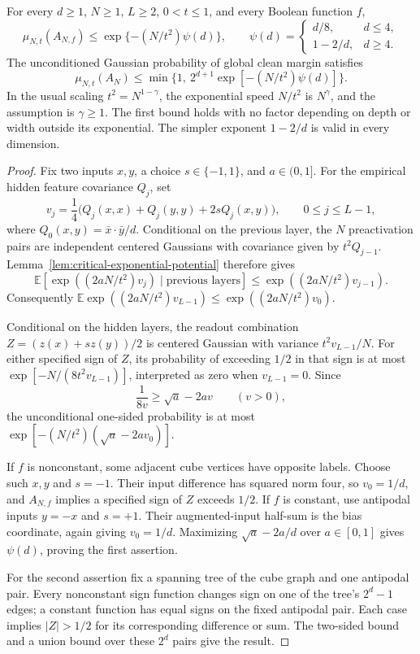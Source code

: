 \begin{theorem}
\label{thm:critical-clean-upper}
For every $d\ge1$, $N\ge1$, $L\ge2$, $0<t\le1$, and every Boolean function $f$,
\[
 \mu_{N,t}(A_{N,f})\le
       \exp\{-(N/t^2)\psi(d)\},
 \qquad
 \psi(d)=\begin{cases}d/8,&d\le4,\\1-2/d,&d\ge4.\end{cases}
\]
The unconditioned Gaussian probability of global clean margin satisfies
\[
 \mu_{N,t}(A_N)\le
       \min\{1,\ 2^{d+1}\exp[-(N/t^2)\psi(d)]\}.
\]
In the usual scaling $t^2=N^{1-\gamma}$, the exponential speed $N/t^2$
is $N^\gamma$, and the assumption is $\gamma\ge1$.
The first bound holds with no factor depending on depth or width outside
its exponential. The simpler exponent $1-2/d$ is valid in every dimension.
\end{theorem}

\begin{proof}
Fix two inputs $x,y$, a choice $s\in\{-1,1\}$, and $a\in(0,1]$.
For the empirical
hidden feature covariance $Q_j$, set
\[
 v_j=\frac14\bigl(Q_j(x,x)+Q_j(y,y)+2sQ_j(x,y)\bigr),
 \qquad 0\le j\le L-1,
\]
where $Q_0(x,y)=\bar x\cdot\bar y/d$. Conditional on the previous
layer, the $N$ preactivation pairs are independent centered Gaussians
with covariance given by $t^2Q_{j-1}$. Lemma~\ref{lem:critical-exponential-potential}
therefore gives
\[
 \mathbb E[\exp((2aN/t^2)v_j)\mid\text{previous layers}]
       \le\exp((2aN/t^2)v_{j-1}).
\]
Consequently $\mathbb E\exp((2aN/t^2)v_{L-1})\le\exp((2aN/t^2)v_0)$.

Conditional on the hidden layers, the readout combination
$Z=(z(x)+sz(y))/2$ is centered Gaussian with variance $t^2v_{L-1}/N$.
For either specified sign of $Z$, its probability of exceeding $1/2$
in that sign is at most $\exp[-N/(8t^2v_{L-1})]$, interpreted as zero
when $v_{L-1}=0$. Since
\[
 \frac1{8v}\ge\sqrt a-2av\qquad(v>0),
\]
the unconditional one-sided probability is at most
$\exp[-(N/t^2)(\sqrt a-2av_0)]$.

If $f$ is nonconstant, some adjacent cube vertices have opposite
labels. Choose such $x,y$ and $s=-1$. Their input difference has
squared norm four, so $v_0=1/d$, and $A_{N,f}$ implies a specified
sign of $Z$ exceeds $1/2$. If $f$ is constant, use antipodal inputs
$y=-x$ and $s=+1$. Their augmented-input half-sum is the bias
coordinate, again giving $v_0=1/d$. Maximizing $\sqrt a-2a/d$ over
$a\in[0,1]$ gives $\psi(d)$, proving the first assertion.

For the second assertion fix a spanning tree of the cube graph and
one antipodal pair. Every nonconstant sign function changes sign on
one of the tree's $2^d-1$ edges; a constant function has equal signs
on the fixed antipodal pair. Each case implies $|Z|>1/2$ for its
corresponding difference or sum. The two-sided bound and a union bound
over these $2^d$ pairs give the result.
\end{proof}

